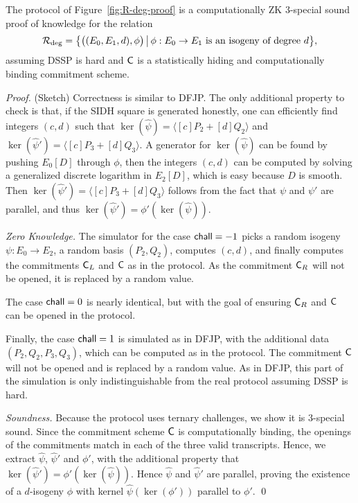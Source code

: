 




\begin{proposition}
    The protocol of Figure~\ref{fig:R-deg-proof} is a computationally ZK 3-special sound proof of knowledge for the relation
    \[\R[deg] = \bigl\{ \bigl((E_0, E_1, d), \phi\bigr) \,\big\vert\, \phi : E_0 \to E_1 \text{ is an isogeny of degree } d \bigr\},\]
    assuming DSSP is hard and $\Com$ is a statistically hiding and computationally binding commitment scheme.
\end{proposition}
\begin{proof} (Sketch)
    Correctness is similar to DFJP. The only additional property to check is that, if the SIDH square is generated honestly, one can efficiently find integers $(c,d)$ such that $\ker(\widehat\psi) = \langle [c]P_2 + [d]Q_2\rangle$ and $\ker(\widehat\psi') = \langle [c]P_3 + [d]Q_3\rangle$.
    A generator for $\ker(\widehat\psi)$ can be found by pushing $E_0[D]$ through $\phi$, then the integers $(c,d)$ can be computed by solving a generalized discrete logarithm in $E_2[D]$, which is easy because $D$ is smooth.
    Then $\ker(\widehat\psi') = \langle [c]P_3 + [d]Q_3\rangle$ follows from the fact that $\psi$ and $\psi'$ are parallel, and thus $\ker(\widehat\psi') = \phi'(\ker(\widehat\psi))$.
    
    \emph{Zero Knowledge.} The simulator for the case $\chall = -1$ picks a random isogeny $\psi:E_0\to E_2$, a random basis $(P_2,Q_2)$, computes $(c,d)$, and finally computes the commitments $\Com_L$ and $\Com$ as in the protocol.
    As the commitment $\Com_R$ will not be opened, it is replaced by a random value.
    
    The case $\chall = 0$ is nearly identical, but with the goal of ensuring $\Com_R$ and $\Com$ can be opened in the protocol.
    
    Finally, the case $\chall = 1$ is simulated as in DFJP, with the additional data $(P_2,Q_2,P_3,Q_3)$, which can be computed as in the protocol.
    The commitment $\Com$ will not be opened and is replaced by a random value.
    As in DFJP, this part of the simulation is only indistinguishable from the real protocol assuming DSSP is hard.
    
    \emph{Soundness.} Because the protocol uses ternary challenges, we show it is 3-special sound.
    Since the commitment scheme $\Com$ is computationally binding, the openings of the commitments match in each of the three valid transcripts. Hence, we extract $\widehat\psi$, $\widehat\psi'$ and $\phi'$, with the additional property that $\ker(\widehat\psi') = \phi'(\ker(\widehat\psi))$.
    Hence $\widehat\psi$ and $\widehat\psi'$ are parallel, proving the existence of a $d$-isogeny $\phi$ with kernel $\widehat\psi(\ker(\phi'))$ parallel to $\phi'$. \qed
\end{proof}


